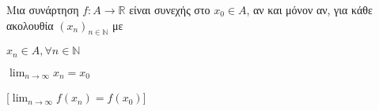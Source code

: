 \documentclass[main.tex]{subfiles}
\begin{document}
\begin{thm}
    Μια συνάρτηση $ f \colon A \to \mathbb{R} $ είναι συνεχής στο $ x_{0} \in A $, 
    αν και μόνον αν, για κάθε ακολουθία $ (x_{n})_{n \in \mathbb{N}} $ με

    \vspace{\baselineskip}

    \begin{minipage}{0.25\textwidth}
        \begin{myitemize}
        \item $ x_{n} \in A, \forall n \in \mathbb{N} $ \hfill {}
        \item $ \lim_{n \to \infty} x_{n} = x_{0} $ \hfill {}
        \end{myitemize}
    \end{minipage}
    [$ \lim_{n \to \infty} f(x_{n}) = f(x_{0}) $]
\end{thm}
\end{document}
